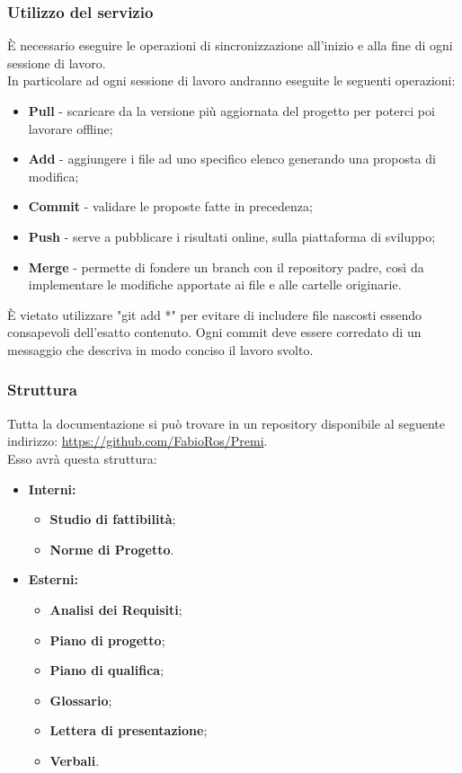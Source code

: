 		\subsubsection{Utilizzo del servizio}
È necessario eseguire le operazioni di sincronizzazione all'inizio e alla fine di ogni sessione di lavoro. \\
In particolare ad ogni sessione di lavoro andranno eseguite le seguenti operazioni:
\begin{itemize}
	\item \textbf{Pull} - scaricare da la versione più aggiornata del progetto per poterci poi lavorare offline;
	\item \textbf{Add} - aggiungere i file ad uno specifico elenco generando una proposta di modifica;
	\item \textbf{Commit} - validare le proposte fatte in precedenza;
	\item \textbf{Push} - serve a pubblicare i risultati online, sulla piattaforma di sviluppo;
	\item \textbf{Merge} - permette di fondere un \gls{branch} con il \gls{repository} padre, così da implementare le modifiche apportate ai file e alle cartelle originarie.
\end{itemize}
È vietato utilizzare "git add *" per evitare di includere file nascosti essendo consapevoli dell'esatto contenuto. Ogni commit deve essere corredato di un messaggio che descriva in modo \gls{conciso} il lavoro svolto.

		\subsubsection{Struttura}
Tutta la documentazione si può trovare in un \gls{repository} disponibile al seguente indirizzo: \url{https://github.com/FabioRos/Premi}. \\
Esso avrà questa struttura:
\begin{itemize}
	\item \textbf{Interni:}
		\begin{itemize}
				\item \textbf{Studio di fattibilità};
				\item \textbf{Norme di Progetto}.
		\end{itemize}
	\item \textbf{Esterni:}
		\begin{itemize}
				\item \textbf{Analisi dei Requisiti};
				\item \textbf{Piano di progetto};
				\item \textbf{Piano di qualifica};
				\item \textbf{Glossario};
				\item \textbf{Lettera di presentazione};
				\item \textbf{Verbali}.
		\end{itemize}
\end{itemize}


